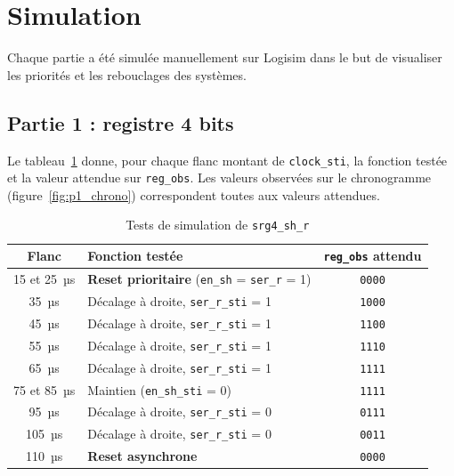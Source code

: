 \newpage
\section{Simulation}

Chaque partie a été simulée manuellement sur Logisim dans le but de visualiser les priorités et les rebouclages des systèmes.
\subsection{Partie 1 : registre 4 bits}

Le tableau~\ref{tab:p1_tests} donne, pour chaque flanc montant de
\texttt{clock\_sti}, la fonction testée et la valeur attendue sur \texttt{reg\_obs}.
Les valeurs observées sur le chronogramme (figure~\ref{fig:p1_chrono})
correspondent toutes aux valeurs attendues.

\begin{table}[H]
  \centering
  \small
  \begin{tabular}{c l c}
    \hline
    \textbf{Flanc} & \textbf{Fonction testée} & \textbf{\texttt{reg\_obs} attendu} \\
    \hline
    15 et 25~µs & \textbf{Reset prioritaire} (\texttt{en\_sh} = \texttt{ser\_r} = 1) & \texttt{0000} \\
    35~µs  & Décalage à droite, \texttt{ser\_r\_sti} = 1 & \texttt{1000} \\
    45~µs  & Décalage à droite, \texttt{ser\_r\_sti} = 1 & \texttt{1100} \\
    55~µs  & Décalage à droite, \texttt{ser\_r\_sti} = 1 & \texttt{1110} \\
    65~µs  & Décalage à droite, \texttt{ser\_r\_sti} = 1 & \texttt{1111} \\
    75 et 85~µs & Maintien (\texttt{en\_sh\_sti} = 0)   & \texttt{1111} \\
    95~µs  & Décalage à droite, \texttt{ser\_r\_sti} = 0 & \texttt{0111} \\
    105~µs & Décalage à droite, \texttt{ser\_r\_sti} = 0 & \texttt{0011} \\
    110~µs & \textbf{Reset asynchrone} & \texttt{0000} \\
    \hline
  \end{tabular}
  \caption{Tests de simulation de \texttt{srg4\_sh\_r}}
  \label{tab:p1_tests}
\end{table}


